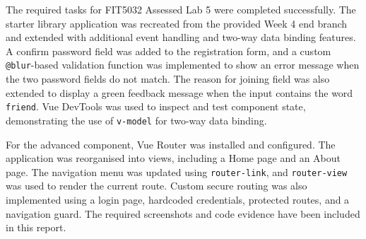 \documentclass[a4paper,11pt]{article}
\begin{document}
The required tasks for FIT5032 Assessed Lab 5 were completed
successfully. The starter library application was recreated from the
provided Week 4 end branch and extended with additional event
handling and two-way data binding features. A confirm password field
was added to the registration form, and a custom
\texttt{@blur}-based validation function was implemented to show an
error message when the two password fields do not match. The reason
for joining field was also extended to display a green feedback
message when the input contains the word \texttt{friend}. Vue
DevTools was used to inspect and test component state, demonstrating
the use of \texttt{v-model} for two-way data binding.

For the advanced component, Vue Router was installed and configured.
The application was reorganised into views, including a Home page and
an About page. The navigation menu was updated using
\texttt{router-link}, and \texttt{router-view} was used to render the
current route. Custom secure routing was also implemented using a
login page, hardcoded credentials, protected routes, and a navigation
guard. The required screenshots and code evidence have been included
in this report.
\end{document}
